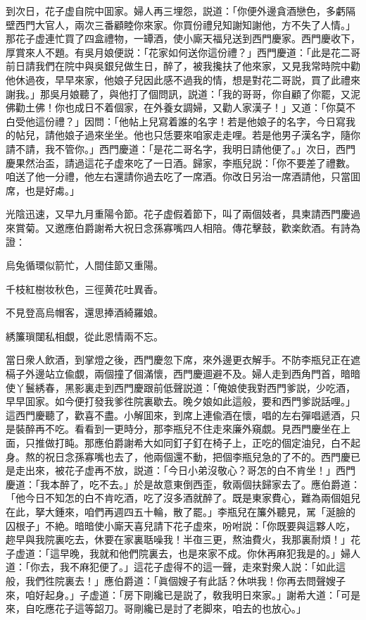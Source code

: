 到次日，花子虚自院中囬家。婦人再三埋怨，説道：「你便外邊貪酒戀色，多虧隔壁西門大官人，兩次三番顧睦你來家。你買份禮兒知謝知謝他，方不失了人情。」那花子虚連忙買了四盒禮物，一罈酒，使小廝天福兒送到西門慶家。西門慶收下，厚賞來人不題。有吳月娘便説：「花家如何送你這份禮？」西門慶道：「此是花二哥前日請我們在院中與吳銀兒做生日，醉了，被我攙扶了他來家，又見我常時院中勸他休過夜，早早來家，他娘子兒因此感不過我的情，想是對花二哥説，買了此禮來謝我。」那吳月娘聽了，與他打了個問訊，説道：「我的哥哥，你自顧了你罷，又泥佛勸土佛！你也成日不着個家，在外養女調婦，又勸人家漢子！」又道：「你莫不白受他這份禮？」因問：「他帖上兒寫着誰的名字！若是他娘子的名字，今日寫我的帖兒，請他娘子過來坐坐。他也只恁要來咱家走走哩。若是他男子漢名字，隨你請不請，我不管你。」西門慶道：「是花二哥名字，我明日請他便了。」次日，西門慶果然治盃，請過這花子虚來吃了一日酒。歸家，李瓶兒説：「你不要差了禮數。咱送了他一分禮，他左右還請你過去吃了一席酒。你改日另治一席酒請他，只當囬席，也是好䖏。」

光陰迅速，又早九月重陽令節。花子虚假着節下，叫了兩個妓者，具柬請西門慶過來賞菊。又邀應伯爵謝希大祝日念孫寡嘴四人相陪。傳花擊鼓，歡楽飲酒。有詩為證：

\begin{myquote}
烏兔循環似箭忙，人間佳節又重陽。

千枝紅樹妆秋色，三徑黄花吐異香。

不見登高烏帽客，還思捧酒綺羅娘。

綉簾瑣闥私相覷，從此恩情兩不忘。
\end{myquote}

當日衆人飲酒，到掌燈之後，西門慶忽下席，來外邊更衣解手。不防李瓶兒正在遮槅子外邊站立偸覷，兩個撞了個滿懷，西門慶逥避不及。婦人走到西角門首，暗暗使丫鬟綉春，黑影裏走到西門慶跟前低聲説道：「俺娘使我對西門爹説，少吃酒，早早囬家。如今便打發我爹徃院裏歇去。晚夕娘如此這般，要和西門爹説話哩。」這西門慶聽了，歡喜不盡。小解囬來，到席上連偸酒在懷，唱的左右彈唱遞酒，只是裝醉再不吃。看看到一更時分，那李瓶兒不住走來廉外窺覷。見西門慶坐在上面，只推做打盹。那應伯爵謝希大如同釘子釘在椅子上，正吃的個定油兒，白不起身。熬的祝日念孫寡嘴也去了，他兩個還不動，把個李瓶兒急的了不的。西門慶已是走出來，被花子虚再不放，説道：「今日小弟沒敬心？哥怎的白不肯坐！」西門慶道：「我本醉了，吃不去。」於是故意東倒西歪，敎兩個扶歸家去了。應伯爵道：「他今日不知怎的白不肯吃酒，吃了沒多酒就醉了。既是東家費心，難為兩個姐兒在此，拏大鍾來，咱們再週四五十輪，散了罷。」李瓶兒在簾外聽見，駡「涎臉的囚根子」不絶。暗暗使小廝天喜兒請下花子虚來，吩咐説：「你既要與這夥人吃，趂早與我院裏吃去，休要在家裏聒噪我！半亱三更，熬油費火，我那裏耐煩！」花子虚道：「這早晚，我就和他們院裏去，也是來家不成。你休再麻犯我是的。」婦人道：「你去，我不麻犯便了。」這花子虚得不的這一聲，走來對衆人説：「如此這般，我們徃院裏去！」應伯爵道：「眞個嫂子有此話？休哄我！你再去問聲嫂子來，咱好起身。」子虚道：「房下剛纔已是説了，敎我明日來家。」謝希大道：「可是來，自吃應花子這等韶刀。哥剛纔已是討了老脚來，咱去的也放心。」

